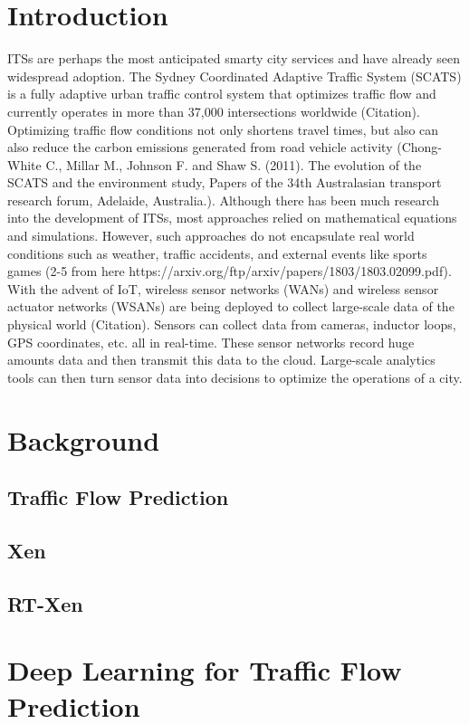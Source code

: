 \section{Introduction}

ITSs are perhaps the most anticipated smarty city services and have already seen widespread
adoption. The Sydney Coordinated Adaptive Traffic System (SCATS) is a fully adaptive urban
traffic control system that optimizes traffic flow and currently operates in more than 37,000
intersections worldwide (Citation). Optimizing traffic flow conditions not only shortens travel
times, but also can also reduce the carbon emissions generated from road vehicle activity
(Chong-White C., Millar M., Johnson F. and Shaw S. (2011). The evolution of the SCATS and
the environment study, Papers of the 34th Australasian transport research forum, Adelaide,
Australia.). Although there has been much research into the development of ITSs, most
approaches relied on mathematical equations and simulations. However, such approaches do not
encapsulate real world conditions such as weather, traffic accidents, and external events like
sports games (2-5 from here https://arxiv.org/ftp/arxiv/papers/1803/1803.02099.pdf). With the
advent of IoT, wireless sensor networks (WANs) and wireless sensor actuator networks
(WSANs) are being deployed to collect large-scale data of the physical world (Citation). Sensors
can collect data from cameras, inductor loops, GPS coordinates, etc. all in real-time. These
sensor networks record huge amounts data and then transmit this data to the cloud. Large-scale
analytics tools can then turn sensor data into decisions to optimize the operations of a city.

\section{Background}
\subsection{Traffic Flow Prediction}
\subsection{Xen}
\subsection{RT-Xen}
\section{Deep Learning for Traffic Flow Prediction}
